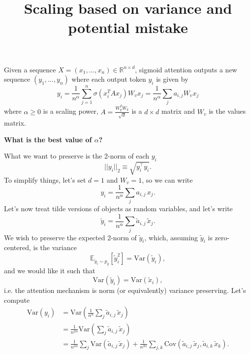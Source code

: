\documentclass{article}
\title{Scaling based on variance and potential mistake}
\author{}
\date{}
\begin{document}
\maketitle



Given a sequence $X = (x_1, \dots, x_n)\in\mathbb{R}^{n\times d}$, sigmoid attention outputs a new sequence $(y_1, \dots, y_n)$ where each output token $y_i$ is given by 
\begin{equation}
y_i = \frac1{n^\alpha}\sum_{j=1}^n\sigma(x_i^TAx_j)W_vx_j    
=  \frac1{n^\alpha}\sum_{j} a_{i,j}W_vx_j
\end{equation}
where $\alpha\geq0$ is a scaling power, $A = \frac{W_q^TW_k}{\sqrt{d}}$ is a $d\times d$ matrix and $W_v$ is the values matrix.

\textbf{What is the best value of $\alpha$?}

What we want to preserve is the 2-norm of each $y_i$
\begin{equation}
    ||y_i||_2\equiv \sqrt{y_i^\intercal y_i}.
\end{equation}
To simplify things, let's set $d=1$ and $W_v=1$,
so we can write
\begin{equation}
y_i 
= \frac1{n^\alpha}\sum_{j} a_{i,j}\,x_j.
\end{equation}
Let's now treat tilde versions of objects as random variables, and let's write
\begin{equation}
\tilde{y}_i 
= \frac1{n^\alpha}\sum_{j} \tilde{a}_{i,j}\,\tilde{x}_j.
\end{equation}
We wish to preserve the expected 2-norm of $\tilde y_i$, which, assuming $\tilde{y}_i$ is zero-centered, is the variance
\begin{equation}
    \mathbb E_{\tilde y_i\sim p_y} [\tilde y_i^2] = \textrm{Var}(\tilde y_i),
\end{equation}
and we would like it such that
\begin{equation}
    \textrm{Var}(\tilde y_i)=\textrm{Var}(\tilde x_i),
\end{equation}
i.e. the attention mechanism is norm (or equivalently) variance preserving.
Let's compute
\begin{align}
\textrm{Var}(y_i) 
&= \textrm{Var}\left(\frac1{n^\alpha}\sum_{j} \tilde{a}_{i,j}\,\tilde{x}_j\right)\\
&= \frac1{n^{2\alpha}}\textrm{Var}\left(\sum_{j} \tilde{a}_{i,j}\,\tilde{x}_j\right)\\
&= \frac1{n^{2\alpha}}\sum_{j}\textrm{Var}\left(  \tilde{a}_{i,j}\,\tilde{x}_j\right) 
+ \frac1{n^{2\alpha}}\sum_{j,k}\textrm{Cov}\left( \tilde{a}_{i,j}\,\tilde{x}_j, \tilde{a}_{i,k}\,\tilde{x}_k\right).
\end{align}
\end{document}
